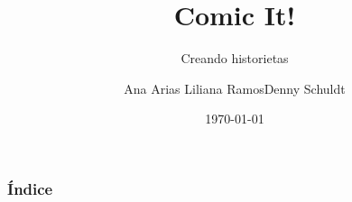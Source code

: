 \documentclass[utf8]{beamer}
\title[Comic It!]{Comic It!}
\subtitle{Creando historietas}
\author[Ana Arias,Liliana Ramos,Denny Schuldt]
{Ana Arias \newline Liliana Ramos\newline Denny Schuldt}
\institute[ESPOL]
{
  Escuela Superior Politécnica del Litoral

}
\date{\today}
\begin{document}
\frame{\titlepage}

\begin{frame}
  \frametitle{Índice}
  \tableofcontents
\end{frame}
\end{document}
